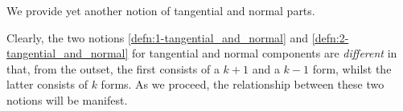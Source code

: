 We provide yet another notion of tangential and normal parts.

\begin{remark}
    Clearly, the two notions \ref{defn:1-tangential_and_normal} and \ref{defn:2-tangential_and_normal} for tangential and normal components are \emph{different} in that, from the outset, the first consists of a $k+1$ and a $k-1$ form, whilst the latter consists of $k$ forms. As we proceed, the relationship between these two notions will be manifest.
\end{remark}

